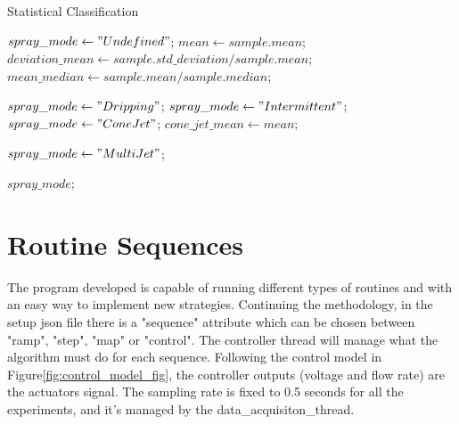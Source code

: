 	\begin{algorithm}
        \caption{Statistical Classification}\label{alg:statistical_class}
        \begin{algorithmic}

            \State $spray\_mode \gets "Undefined"$;
            \State $mean \gets sample.mean$; 
            \State $deviation\_mean \gets sample.std\_deviation / sample.mean$;
            \State $mean\_median \gets sample.mean / sample.median$;
            
                \State $spray\_mode \gets "Dripping"$;
                \State $spray\_ mode \gets "Intermittent"$;
                \EndIf
                \State $spray\_ mode \gets "Cone Jet"$;
                \State $cone\_jet\_mean \gets mean$;
            \EndIf

            \EndIf

                    \State $spray\_ mode \gets "Multi Jet"$;
                \EndIf
            \EndIf

            \Return $spray\_ mode$;
        \EndFunction
        \end{algorithmic}
    \end{algorithm}



\section{Routine Sequences}
\label{sec:routine_sequences}

    The program developed is capable of running different types of routines and with an easy way to implement new strategies.
    Continuing the methodology, in the setup json file there is a "sequence" attribute which can be chosen between "ramp", "step", "map" or "control".
    The controller thread will manage what the algorithm must do for each sequence.
    Following the control model in Figure\ref{fig:control_model_fig}, the controller outputs (voltage and flow rate) are the actuators signal.
    The sampling rate is fixed to 0.5 seconds for all the experiments, and it's managed by the data\_acquisiton\_thread.


